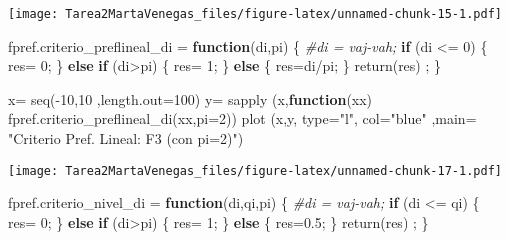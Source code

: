 \documentclass[
]{article}
\newenvironment{Shaded}{\begin{snugshade}}{\end{snugshade}}
\newcommand{\AttributeTok}[1]{\textcolor[rgb]{0.77,0.63,0.00}{#1}}
\newcommand{\CommentTok}[1]{\textcolor[rgb]{0.56,0.35,0.01}{\textit{#1}}}
\newcommand{\ControlFlowTok}[1]{\textcolor[rgb]{0.13,0.29,0.53}{\textbf{#1}}}
\newcommand{\DecValTok}[1]{\textcolor[rgb]{0.00,0.00,0.81}{#1}}
\newcommand{\FloatTok}[1]{\textcolor[rgb]{0.00,0.00,0.81}{#1}}
\newcommand{\FunctionTok}[1]{\textcolor[rgb]{0.00,0.00,0.00}{#1}}
\newcommand{\NormalTok}[1]{#1}
\newcommand{\OtherTok}[1]{\textcolor[rgb]{0.56,0.35,0.01}{#1}}
\newcommand{\SpecialCharTok}[1]{\textcolor[rgb]{0.00,0.00,0.00}{#1}}
\newcommand{\StringTok}[1]{\textcolor[rgb]{0.31,0.60,0.02}{#1}}
\begin{document}
\texttt{[image: Tarea2MartaVenegas\_files/figure-latex/unnamed-chunk-15-1.pdf]}

\begin{Shaded}
\begin{Highlighting}[]
\NormalTok{fpref.criterio\_preflineal\_di }\OtherTok{=} \ControlFlowTok{function}\NormalTok{(di,pi) \{}
              \CommentTok{\#di = vaj{-}vah;}
    \ControlFlowTok{if}\NormalTok{ (di }\SpecialCharTok{\textless{}=} \DecValTok{0}\NormalTok{) \{}
\NormalTok{      res}\OtherTok{=} \DecValTok{0}\NormalTok{;}
\NormalTok{      \} }\ControlFlowTok{else} \ControlFlowTok{if}\NormalTok{ (di}\SpecialCharTok{\textgreater{}}\NormalTok{pi) \{}
\NormalTok{        res}\OtherTok{=} \DecValTok{1}\NormalTok{;}
\NormalTok{      \} }\ControlFlowTok{else}\NormalTok{ \{}
\NormalTok{        res}\OtherTok{=}\NormalTok{di}\SpecialCharTok{/}\NormalTok{pi;}
\NormalTok{      \}}
       \FunctionTok{return}\NormalTok{(res) ;}
\NormalTok{  \}}
\end{Highlighting}
\end{Shaded}

\begin{Shaded}
\begin{Highlighting}[]
\NormalTok{x}\OtherTok{=} \FunctionTok{seq}\NormalTok{(}\SpecialCharTok{{-}}\DecValTok{10}\NormalTok{,}\DecValTok{10}\NormalTok{ ,}\AttributeTok{length.out=}\DecValTok{100}\NormalTok{)}
\NormalTok{y}\OtherTok{=} \FunctionTok{sapply}\NormalTok{ (x,}\ControlFlowTok{function}\NormalTok{(xx) }\FunctionTok{fpref.criterio\_preflineal\_di}\NormalTok{(xx,}\AttributeTok{pi=}\DecValTok{2}\NormalTok{))}
\FunctionTok{plot}\NormalTok{ (x,y, }\AttributeTok{type=}\StringTok{"l"}\NormalTok{, }\AttributeTok{col=}\StringTok{"blue"}\NormalTok{ ,}\AttributeTok{main=} \StringTok{"Criterio}
\StringTok{      Pref. Lineal: F3 (con pi=2)"}\NormalTok{)}
\end{Highlighting}
\end{Shaded}

\texttt{[image: Tarea2MartaVenegas\_files/figure-latex/unnamed-chunk-17-1.pdf]}

\begin{Shaded}
\begin{Highlighting}[]
\NormalTok{fpref.criterio\_nivel\_di }\OtherTok{=} \ControlFlowTok{function}\NormalTok{(di,qi,pi) \{}
              \CommentTok{\#di = vaj{-}vah;}
    \ControlFlowTok{if}\NormalTok{ (di }\SpecialCharTok{\textless{}=}\NormalTok{ qi) \{}
\NormalTok{      res}\OtherTok{=} \DecValTok{0}\NormalTok{;}
\NormalTok{      \} }\ControlFlowTok{else} \ControlFlowTok{if}\NormalTok{ (di}\SpecialCharTok{\textgreater{}}\NormalTok{pi) \{}
\NormalTok{        res}\OtherTok{=} \DecValTok{1}\NormalTok{;}
\NormalTok{      \} }\ControlFlowTok{else}\NormalTok{ \{}
\NormalTok{        res}\OtherTok{=}\FloatTok{0.5}\NormalTok{;}
\NormalTok{      \}}
       \FunctionTok{return}\NormalTok{(res) ;}
\NormalTok{  \}}
\end{Highlighting}
\end{Shaded}
\end{document}
